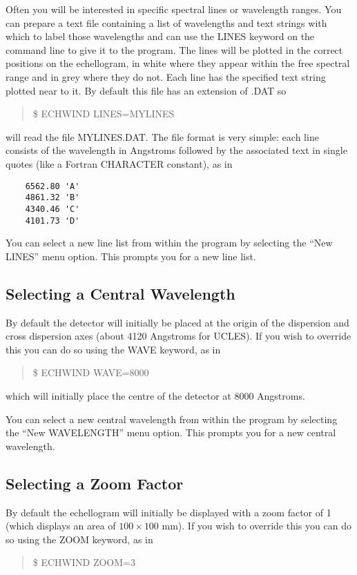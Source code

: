 Often you will be interested in specific spectral lines or wavelength ranges.
You can prepare a text file containing a list of wavelengths and text strings
with which to label those wavelengths and can use the LINES keyword on the
command line to give it to the program. The lines will be plotted in the
correct positions on the echellogram, in white where they appear within the
free spectral range and in grey where they do not. Each line has the specified
text string plotted near to it. By default this file has an extension of .DAT
so
\begin{quote}
\$ ECHWIND LINES=MYLINES
\end{quote}
will read the file MYLINES.DAT. The file format is very simple: each line
consists of the wavelength in Angstroms followed by the associated text in
single quotes (like a Fortran CHARACTER constant), as in
\begin{verbatim}
    6562.80 'A'
    4861.32 'B'
    4340.46 'C'
    4101.73 'D'
\end{verbatim}

You can select a new line list from within the program by selecting the ``New
LINES'' menu option. This prompts you for a new line list.

\subsection{Selecting a Central Wavelength}

By default the detector will initially be placed at the origin of the
dispersion and cross dispersion axes (about 4120 Angstroms for UCLES). If you
wish to override this you can do so using the WAVE keyword, as in
\begin{quote}
\$ ECHWIND WAVE=8000
\end{quote}
which will initially place the centre of the detector at 8000 Angstroms.

You can select a new central wavelength from within the program by selecting
the ``New WAVELENGTH'' menu option. This prompts you for a new central
wavelength.

\subsection{Selecting a Zoom Factor}

By default the echellogram will initially be displayed with a zoom factor of 1
(which displays an area of $100 \times 100$ mm). If you wish to override this
you can do so using the ZOOM keyword, as in
\begin{quote}
\$ ECHWIND ZOOM=3
\end{quote}

